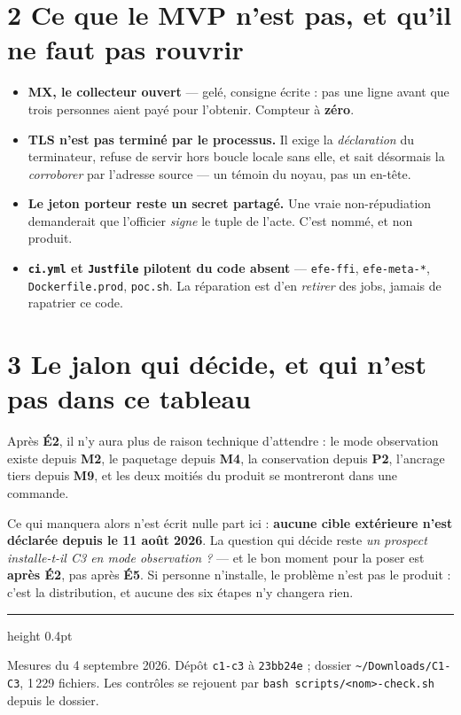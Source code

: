 \documentclass[11pt]{article}
\newcommand{\code}[1]{\texttt{\small #1}}
\newcommand{\pire}[1]{{\color{efered}\textbf{#1}}}
\newcommand{\mm}[1]{\textbf{#1}}
\begin{document}
\section{2 \;\textbar\; Ce que le MVP n'est pas, et qu'il ne faut pas rouvrir}

\begin{itemize}[leftmargin=1.1em,itemsep=1.5pt,topsep=2pt]
\item \textbf{\mm{MX}, le collecteur ouvert} --- gelé, consigne écrite : pas une ligne avant que
trois personnes aient payé pour l'obtenir. Compteur à \pire{zéro}.
\item \textbf{TLS n'est pas terminé par le processus.} Il exige la \emph{déclaration} du
terminateur, refuse de servir hors boucle locale sans elle, et sait désormais la
\emph{corroborer} par l'adresse source --- un témoin du noyau, pas un en-tête.
\item \textbf{Le jeton porteur reste un secret partagé.} Une vraie non-répudiation demanderait que
l'officier \emph{signe} le tuple de l'acte. C'est nommé, et non produit.
\item \textbf{\code{ci.yml} et \code{Justfile} pilotent du code absent} --- \code{efe-ffi},
\code{efe-meta-*}, \code{Dockerfile.prod}, \code{poc.sh}. La réparation est d'en \emph{retirer}
des jobs, jamais de rapatrier ce code.
\end{itemize}

\section{3 \;\textbar\; Le jalon qui décide, et qui n'est pas dans ce tableau}

\begin{cadre}
Après \mm{É2}, il n'y aura plus de raison technique d'attendre : le mode observation existe depuis
\mm{M2}, le paquetage depuis \mm{M4}, la conservation depuis \mm{P2}, l'ancrage tiers depuis
\mm{M9}, et les deux moitiés du produit se montreront dans une commande.

Ce qui manquera alors n'est écrit nulle part ici : \textbf{aucune cible extérieure n'est déclarée
depuis le 11 août 2026}. La question qui décide reste \emph{un prospect installe-t-il C3 en mode
observation ?} --- et le bon moment pour la poser est \textbf{après \mm{É2}}, pas après \mm{É5}.
Si personne n'installe, le problème n'est pas le produit : c'est la distribution, et aucune des
six étapes n'y changera rien.
\end{cadre}

\vspace{4pt}
{\color{efegray}\hrule height 0.4pt}\vspace{2.5pt}
{\footnotesize\color{efegray}Mesures du 4 septembre 2026. Dépôt \code{c1-c3} à \code{23bb24e} ;
dossier \code{\textasciitilde/Downloads/C1-C3}, 1\,229 fichiers. Les contrôles se rejouent par
\code{bash scripts/<nom>-check.sh} depuis le dossier.}
\end{document}
